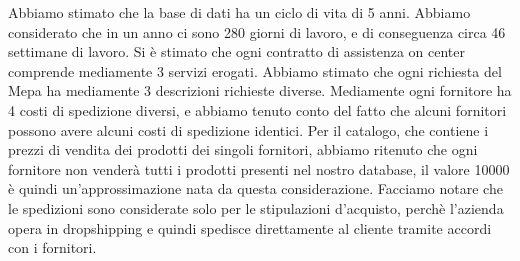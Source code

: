 \noindent{}

\noindent
Abbiamo stimato che la base di dati ha un ciclo di vita di 5 anni.
\newline
Abbiamo considerato che in un anno ci sono 280 giorni di lavoro, e di conseguenza circa 46 settimane di lavoro.
\newline
Si è stimato che ogni contratto di assistenza on center comprende mediamente 3 servizi erogati.
\newline
Abbiamo stimato che ogni richiesta del Mepa ha mediamente 3 descrizioni richieste diverse.
\newline
Mediamente ogni fornitore ha 4 costi di spedizione diversi, e abbiamo tenuto conto del fatto che alcuni fornitori possono avere alcuni costi di spedizione identici.
\newline
Per il catalogo, che contiene i prezzi di vendita dei prodotti dei singoli fornitori, abbiamo ritenuto che ogni fornitore non venderà tutti i prodotti presenti nel nostro database, il valore 10000 è quindi un'approssimazione nata da questa considerazione.
\newline
Facciamo notare che le spedizioni sono considerate solo per le stipulazioni d'acquisto, perchè l'azienda opera in dropshipping e quindi spedisce direttamente al cliente tramite accordi con i fornitori.

